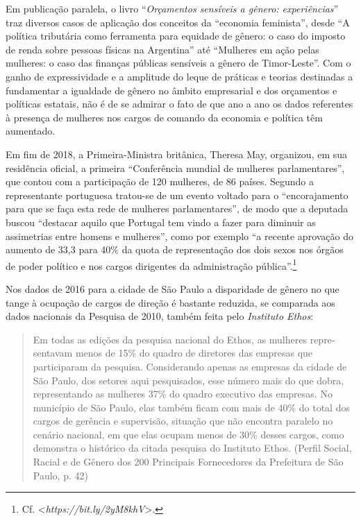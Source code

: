Em publicação paralela, o livro ``\emph{Orçamentos sensíveis a gênero:
experiências}'' traz diversos casos de aplicação dos conceitos da
``economia feminista'', desde ``A política tributária como ferramenta
para equidade de gênero: o caso do imposto de renda sobre pessoas
físicas na Argentina'' até ``Mulheres em ação pelas mulheres: o caso das
finanças públicas sensíveis a gênero de Timor-Leste''. Com o ganho de
expressividade e a amplitude do leque de práticas e teorias destinadas a
fundamentar a igualdade de gênero no âmbito empresarial e dos orçamentos
e políticas estatais, não é de se admirar o fato de que ano a ano os
dados referentes à presença de mulheres nos cargos de comando da
economia e política têm aumentado.

Em fim de 2018, a Primeira-Ministra britânica, Theresa May, organizou,
em sua residência oficial, a primeira ``Conferência mundial de mulheres
parlamentares'', que contou com a participação de 120 mulheres, de 86
países. Segundo a representante portuguesa tratou-se de um evento
voltado para o ``encorajamento para que se faça esta rede de mulheres
parlamentares'', de modo que a deputada buscou ``destacar aquilo que
Portugal tem vindo a fazer para diminuir as assimetrias entre homens e
mulheres'', como por exemplo ``a recente aprovação do aumento de 33,3
para 40\% da quota de representação dos dois sexos nos órgãos de poder
político e nos cargos dirigentes da administração pública''.\footnote{Cf.
  \textless{}\emph{https://bit.ly/2yM8khV}\textgreater{}.}

Nos dados de 2016 para a cidade de São Paulo a disparidade de gênero no
que tange à ocupação de cargos de direção é bastante reduzida, se
comparada aos dados nacionais da Pesquisa de 2010, também feita pelo
\emph{Instituto Ethos}:

\begin{quote}
Em todas as edições da pesquisa nacional do Ethos, as mulheres
repre­sentavam menos de 15\% do quadro de diretores das empresas que
participaram da pesquisa. Con­siderando apenas as empresas da cidade de
São Paulo, dos setores aqui pesquisados, esse número mais do que dobra,
representando as mulheres 37\% do quadro executivo das empresas. No
município de São Paulo, elas também ficam com mais de 40\% do total dos
cargos de ge­rência e supervisão, situação que não encontra paralelo no
cenário nacional, em que elas ocupam menos de 30\% desses cargos, como
de­monstra o histórico da citada pesquisa do Insti­tuto Ethos. (Perfil
Social, Racial e de Gênero dos 200 Principais Fornecedores da Prefeitura
de São Paulo, p. 42)
\end{quote}

